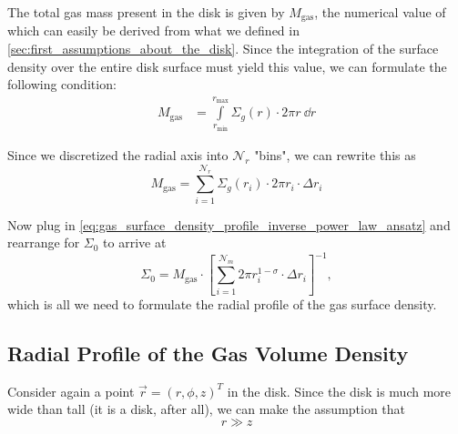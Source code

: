         The total gas mass present in the disk is given by $M_\text{gas}$, the numerical value of 
        which can easily be derived from what we defined in
        \cref{sec:first_assumptions_about_the_disk}. Since the integration of the surface density 
        over the entire disk surface must yield this value, we can formulate the following 
        condition:
        \begin{align}
            M_\text{gas}
                &= \int\limits_{r_\text{min}}^{r_\text{max}} \Sigma_g(r) \cdot 2\pi r \ \dd r
        \end{align}

        Since we discretized the radial axis into $\mathcal N_r$ "bins", we can rewrite this as
        \begin{equation}
            M_\text{gas} = \sum_{i=1}^{\mathcal N_r} \Sigma_g(r_i) \cdot 2\pi r_i \cdot \Delta r_i
        \end{equation}

        Now plug in \cref{eq:gas_surface_density_profile_inverse_power_law_ansatz} and 
        rearrange for $\Sigma_0$ to arrive at
        \begin{equation}
            \Sigma_0
                = M_\text{gas} \cdot \left[
                    \sum_{i=1}^{\mathcal N_m} 2\pi r_i^{1-\sigma} \cdot \Delta r_i
                \right]^{-1},
        \end{equation}
        which is all we need to formulate the radial profile of the gas surface density.

    \newpage\subsection{Radial Profile of the Gas Volume Density}
        
        Consider again a point $\vec r=(r,\phi,z)^T$ in the disk. Since the disk is much more wide 
        than tall (it is a disk, after all), we can make the assumption that
        \begin{equation}
            \label{eq:r_much_bigger_than_z}
            r\gg z 
        \end{equation}

